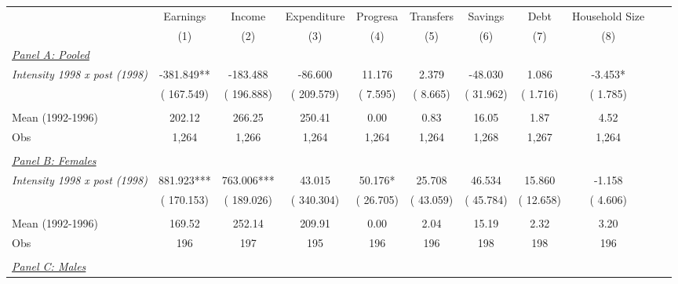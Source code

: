 \begin{tabular}{lcccccccccc} \hline \hline
& \multicolumn{1}{c}{Earnings} & \multicolumn{1}{c}{Income} & \multicolumn{1}{c}{Expenditure} & \multicolumn{1}{c}{Progresa} & \multicolumn{1}{c}{Transfers} & \multicolumn{1}{c}{Savings} & \multicolumn{1}{c}{Debt} & \multicolumn{1}{c}{Household Size}  \\ 
\cmidrule(lr){2-2}\cmidrule(lr){3-3}\cmidrule(lr){4-4} \cmidrule(lr){5-5}\cmidrule(lr){6-6}\cmidrule(lr){7-7}\cmidrule(lr){8-8} \cmidrule(lr){9-9}
& (1) & (2) & (3) & (4) & (5) & (6) & (7) & (8)  \\  \toprule
\underline{\textit{Panel A: Pooled}}  \\  
\textit{Intensity 1998 x post (1998)} &     -381.849**  &     -183.488 &      -86.600 &       11.176 &        2.379 &      -48.030 &        1.086 &       -3.453*\\  
& (     167.549)  & (     196.888) & (     209.579) & (       7.595) & (       8.665)  & (      31.962) & (       1.716) & (       1.785)\\ 
  & & &  & & & & & \\ 
Mean (1992-1996) &       202.12  &       266.25 &       250.41 &         0.00 &         0.83 &        16.05&         1.87 &         4.52  \\  
Obs &        1,264  &        1,266 &        1,264 &        1,264 &        1,264 &        1,268 &        1,267 &        1,264 \\ 
  & & &  & & & & & \\ 
\underline{\textit{Panel B: Females}}  \\  
\textit{Intensity 1998 x post (1998)} &      881.923***  &      763.006*** &       43.015 &       50.176* &       25.708 &       46.534 &       15.860 &       -1.158\\  
& (     170.153)  & (     189.026) & (     340.304) & (      26.705) & (      43.059)  & (      45.784) & (      12.658) & (       4.606)\\ 
  & & &  & & & & & \\ 
Mean (1992-1996) &       169.52  &       252.14 &       209.91 &         0.00 &         2.04 &        15.19&         2.32 &         3.20  \\  
Obs &          196  &          197 &          195 &          196 &          196 &          198 &          198 &          196 \\ 
  & & &  & & & & & \\ 
\underline{\textit{Panel C: Males}}  \\  

\end{tabular}
